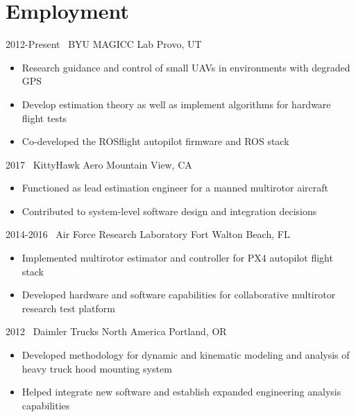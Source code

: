 

\section{Employment}

\begin{entrylist}
\entry
{2012-Present}
{~BYU MAGICC Lab}
{Provo, UT}
{
\begin{itemize}
	\item Research guidance and control of small UAVs in environments with degraded GPS
	\item Develop estimation theory as well as implement algorithms for hardware flight tests
	\item Co-developed the ROSflight autopilot firmware and ROS stack
\end{itemize}
}
\entry
{2017}
{~KittyHawk Aero}
{Mountain View, CA}
{
\begin{itemize}
	\item Functioned as lead estimation engineer for a manned multirotor aircraft
	\item Contributed to system-level software design and integration decisions
\end{itemize}
}
\entry
{2014-2016}
{~Air Force Research Laboratory}
{Fort Walton Beach, FL}
{
\begin{itemize}
	\item Implemented multirotor estimator and controller for PX4 autopilot flight stack
	\item Developed hardware and software capabilities for collaborative multirotor research test platform
\end{itemize}
}
\entry
{2012}
{~Daimler Trucks North America}
{Portland, OR}
{
\begin{itemize}
	\item Developed methodology for dynamic and kinematic modeling and analysis of heavy truck hood mounting system
	\item Helped integrate new software and establish expanded engineering analysis capabilities
\end{itemize}}

\end{entrylist}
